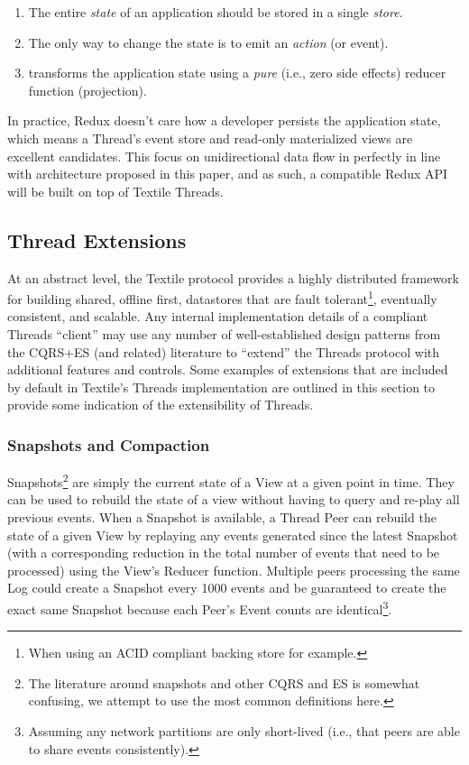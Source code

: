 \documentclass{textile}
\begin{document}
\begin{enumerate}
\item The entire \emph{state} of an application should be stored in a single \emph{store}.
\item The only way to change the state is to emit an \emph{action} (or event).
\item transforms the application state using a \emph{pure} (i.e., zero side effects) reducer function (projection).
\end{enumerate}

In practice, Redux doesn't care how a developer persists the application state, which means a Thread's event store and read-only materialized views are excellent candidates. This focus on unidirectional data flow in perfectly in line with architecture proposed in this paper, and as such, a compatible Redux API will be built on top of Textile Threads.

\subsection{Thread Extensions}

At an abstract level, the Textile protocol provides a highly distributed framework for building shared, offline first, datastores that are fault tolerant\footnote{When using an ACID compliant backing store for example.}, eventually consistent, and scalable. Any internal implementation details of a compliant Threads ``client'' may use any number of well-established design patterns from the CQRS+ES (and related) literature to ``extend'' the Threads protocol with additional features and controls. Some examples of extensions that are included by default in Textile's Threads implementation are outlined in this section to provide some indication of the extensibility of Threads.

\subsubsection{Snapshots and Compaction}\label{sec:SnapshotsCompaction}

Snapshots\footnote{The literature around snapshots and other CQRS and ES is somewhat confusing, we attempt to use the most common definitions here.} are simply the current state of a View at a given point in time. They can be used to rebuild the state of a view without having to query and re-play all previous events. When a Snapshot is available, a Thread Peer can rebuild the state of a given View by replaying any events generated since the latest Snapshot (with a corresponding reduction in the total number of events that need to be processed) using the View's Reducer function. Multiple peers processing the same Log could create a Snapshot every 1000 events and be guaranteed to create the exact same Snapshot because each Peer's Event counts are identical\footnote{Assuming any network partitions are only short-lived (i.e., that peers are able to share events consistently).}. 
\end{document}
